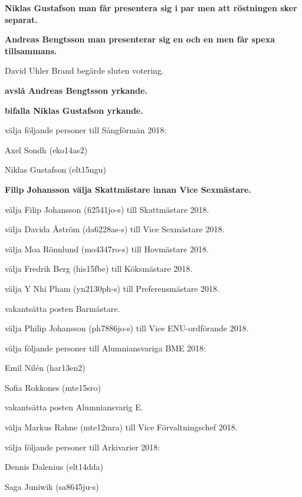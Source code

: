 \documentclass[10pt]{article}
\begin{document}
\begin{paragrafer}
\begin{paralist}
    \textbf{\Mbaby}

    \textbf{Niklas Gustafson \ypa man får presentera sig i par men att röstningen sker separat.}

    \textbf{Andreas Bengtsson \ypa man presenterar sig en och en men får spexa tillsammans.}

    David Uhler Brand begärde sluten votering.

    \textbf{\Mba avslå Andreas Bengtsson yrkande.}

    \textbf{\Mba bifalla Niklas Gustafson yrkande.}

    \Mba välja följande personer till Sångförmän 2018:
    \begin{tightdashlist}
        \item Axel Sondh (eko14as2)
        \item Niklas Gustafson (elt15ngu)
    \end{tightdashlist}

    \textbf{Filip Johansson \ypa välja Skattmästare innan Vice Sexmästare.}

    \textbf{\Mbaby}

    \Mba välja Filip Johansson (fi2541jo-s) till Skattmästare 2018.

    \Mba välja Davida Åström (da6228as-s) till Vice Sexmästare 2018.

    \Mba välja Moa Rönnlund (mo4347ro-s) till Hovmästare 2018.

    \Mba välja Fredrik Berg (his15fbe) till Köksmästare 2018.

    \Mba välja Y Nhi Pham (yn2130ph-s) till Preferensmästare 2018.

    \Mba vakantsätta posten Barmästare.

    \Mba välja Philip Johansson (ph7886jo-s) till Vice ENU-ordförande 2018.

    \Mba välja följande personer till Alumniansvariga BME 2018:
    \begin{tightdashlist}
      \item Emil Nilén (har13en2)
      \item Sofia Rokkones (mte15sro)
    \end{tightdashlist}

    \Mba vakantsätta posten Alumniansvarig E.

    \Mba välja Markus Rahne (mte12mra) till Vice Förvaltningschef 2018.

    \Mba välja följande personer till Arkivarier 2018:
    \begin{tightdashlist}
        \item Dennis Dalenius (elt14dda)
        \item Saga Juniwik (sa8645ju-s)
    \end{tightdashlist}


\end{paralist}
\end{paragrafer}
\end{document}
